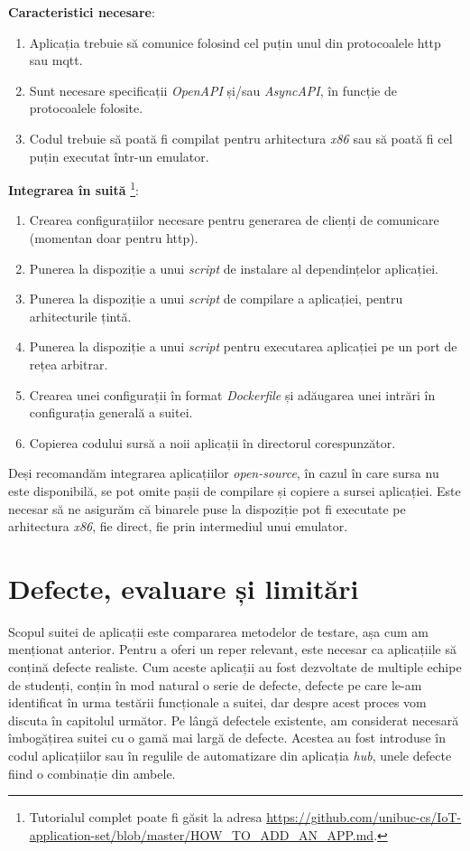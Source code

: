 \textbf{Caracteristici necesare}:
\begin{enumerate}
    \item Aplicația trebuie să comunice folosind cel puțin unul din protocoalele \acrshort{http} sau \acrshort{mqtt}.
    \item Sunt necesare specificații \textit{OpenAPI} și/sau \textit{AsyncAPI}, în funcție de protocoalele folosite.
    \item Codul trebuie să poată fi compilat pentru arhitectura \textit{x86} sau să poată fi cel puțin executat într-un emulator.
\end{enumerate}

\textbf{Integrarea în suită} \footnote{Tutorialul complet poate fi găsit la adresa \url{https://github.com/unibuc-cs/IoT-application-set/blob/master/HOW_TO_ADD_AN_APP.md}.}:
\begin{enumerate}
    \item Crearea configurațiilor necesare pentru generarea de clienți de comunicare (momentan doar pentru \acrshort{http}).
    \item Punerea la dispoziție a unui \textit{script} de instalare al dependințelor aplicației.
    \item Punerea la dispoziție a unui \textit{script} de compilare a aplicației, pentru arhitecturile țintă.
    \item Punerea la dispoziție a unui \textit{script} pentru executarea aplicației pe un port de rețea arbitrar.
    \item Crearea unei configurații în format \textit{Dockerfile} și adăugarea unei intrări în configurația generală a suitei.
    \item Copierea codului sursă a noii aplicații în directorul corespunzător.
\end{enumerate}

Deși recomandăm integrarea aplicațiilor \textit{open-source}, în cazul în care sursa nu este disponibilă, se pot omite pașii de compilare și copiere a sursei aplicației. Este necesar să ne asigurăm că binarele puse la dispoziție pot fi executate pe arhitectura \textit{x86}, fie direct, fie prin intermediul unui emulator.

\section{Defecte, evaluare și limitări}

Scopul suitei de aplicații este compararea metodelor de testare, așa cum am menționat anterior. Pentru a oferi un reper relevant, este necesar ca aplicațiile să conțină defecte realiste. Cum aceste aplicații au fost dezvoltate de multiple echipe de studenți, conțin în mod natural o serie de defecte, defecte pe care le-am identificat în urma testării funcționale a suitei, dar despre acest proces vom discuta în capitolul următor. Pe lângă defectele existente, am considerat necesară îmbogățirea suitei cu o gamă mai largă de defecte. Acestea au fost introduse în codul aplicațiilor sau în regulile de automatizare din aplicația \textit{hub}, unele defecte fiind o combinație din ambele.

